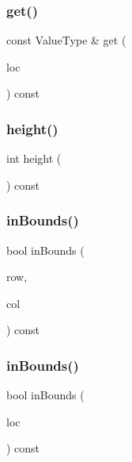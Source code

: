 \mbox{\label{classGrid_ad9a359dc416919242abe643f7677f491}} 
\subsubsection{\texorpdfstring{get()}{get()}\hspace{0.1cm}{\footnotesize\ttfamily [4/4]}}
{\footnotesize\ttfamily const Value\+Type \& get (\begin{DoxyParamCaption}\item[{const \mbox{\hyperlink{structGridLocation}{Grid\+Location}} \&}]{loc }\end{DoxyParamCaption}) const}

\mbox{\label{classGrid_ad3774f6419003470f54fd495124ef51f}} 
\subsubsection{\texorpdfstring{height()}{height()}}
{\footnotesize\ttfamily int height (\begin{DoxyParamCaption}{ }\end{DoxyParamCaption}) const}

\mbox{\label{classGrid_aa0a86249b1e35e3b741f1e19283c298a}} 
\subsubsection{\texorpdfstring{in\+Bounds()}{inBounds()}\hspace{0.1cm}{\footnotesize\ttfamily [1/2]}}
{\footnotesize\ttfamily bool in\+Bounds (\begin{DoxyParamCaption}\item[{int}]{row,  }\item[{int}]{col }\end{DoxyParamCaption}) const}

\mbox{\label{classGrid_a1b7d34c13c853a2ac9bdc084ec1535e9}} 
\subsubsection{\texorpdfstring{in\+Bounds()}{inBounds()}\hspace{0.1cm}{\footnotesize\ttfamily [2/2]}}
{\footnotesize\ttfamily bool in\+Bounds (\begin{DoxyParamCaption}\item[{const \mbox{\hyperlink{structGridLocation}{Grid\+Location}} \&}]{loc }\end{DoxyParamCaption}) const}

